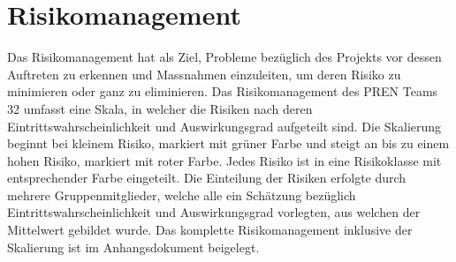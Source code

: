 \section{Risikomanagement}
Das Risikomanagement hat als Ziel, Probleme bezüglich des Projekts vor dessen Auftreten zu erkennen und Massnahmen
einzuleiten, um deren Risiko zu minimieren oder ganz zu eliminieren.
Das Risikomanagement des PREN Teams 32 umfasst eine Skala, in welcher die Risiken nach deren 
Eintrittswahrscheinlichkeit und Auswirkungsgrad aufgeteilt sind. Die Skalierung beginnt bei kleinem Risiko, markiert mit grüner Farbe 
und steigt an bis zu einem hohen Risiko, markiert mit roter Farbe. Jedes Risiko ist in eine Risikoklasse mit entsprechender Farbe eingeteilt. 
Die Einteilung der Risiken erfolgte durch mehrere Gruppenmitglieder, welche alle ein Schätzung 
bezüglich Eintrittswahrscheinlichkeit und Auswirkungsgrad vorlegten, aus welchen der Mittelwert gebildet wurde.
Das komplette Risikomanagement inklusive der Skalierung ist im Anhangsdokument beigelegt.